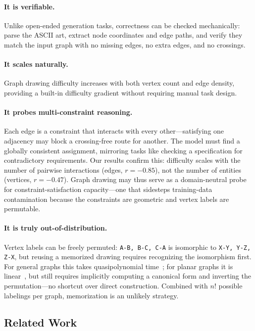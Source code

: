 \documentclass{article}
\begin{document}
\paragraph{It is verifiable.}
Unlike open-ended generation tasks, correctness can be checked mechanically: parse the ASCII art, extract node coordinates and edge paths, and verify they match the input graph with no missing edges, no extra edges, and no crossings.

\paragraph{It scales naturally.}
Graph drawing difficulty increases with both vertex count and edge density, providing a built-in difficulty gradient without requiring manual task design.

\paragraph{It probes multi-constraint reasoning.}
Each edge is a constraint that interacts with every other---satisfying one adjacency may block a crossing-free route for another. The model must find a globally consistent assignment, mirroring tasks like checking a specification for contradictory requirements. Our results confirm this: difficulty scales with the number of pairwise interactions (edges, $r = -0.85$), not the number of entities (vertices, $r = -0.47$). Graph drawing may thus serve as a domain-neutral probe for constraint-satisfaction capacity---one that sidesteps training-data contamination because the constraints are geometric and vertex labels are permutable.

\paragraph{It is truly out-of-distribution.}
Vertex labels can be freely permuted: \texttt{A-B, B-C, C-A} is isomorphic to \texttt{X-Y, Y-Z, Z-X}, but reusing a memorized drawing requires recognizing the isomorphism first. For general graphs this takes quasipolynomial time~\citep{babai2016}; for planar graphs it is linear~\citep{hopcroft1974}, but still requires implicitly computing a canonical form and inverting the permutation---no shortcut over direct construction. Combined with $n!$ possible labelings per graph, memorization is an unlikely strategy.

\subsection{Related Work}
\end{document}

